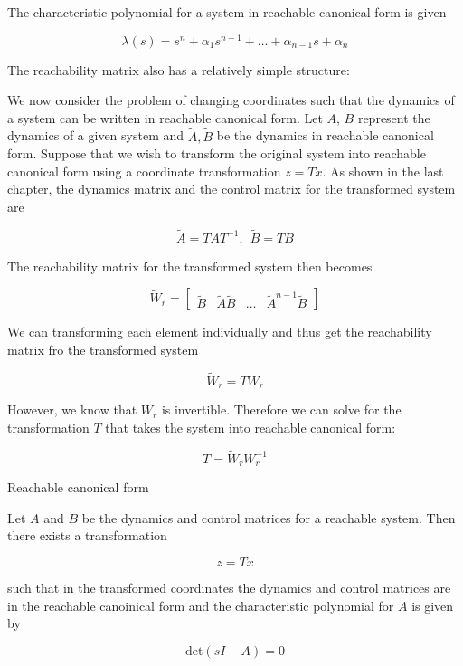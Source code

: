 The characteristic polynomial for a system in reachable canonical form is given

\begin{equation}
\lambda(s) = s^n +\alpha_1s^{n-1}+ \dots + \alpha_{n-1}s + \alpha_n
\end{equation}

The reachability matrix also has a relatively simple structure:

We now consider the problem of changing coordinates such that the dynamics
of a system can be written in reachable canonical form. Let $A$, $B$ represent the
dynamics of a given system and $\tilde{A}, \tilde{B}$ be the dynamics in reachable canonical form.
Suppose that we wish to transform the original system into reachable canonical
form using a coordinate transformation $z = Tx$. As shown in the last chapter, the
dynamics matrix and the control matrix for the transformed system are

\begin{equation}
\tilde{A} = TAT^{-1}, ~~ \tilde{B} = TB
\end{equation}

The reachability matrix for the transformed system then becomes

\begin{equation}
\tilde{W}_r = \begin{bmatrix}
 \tilde{B} & \tilde{A}\tilde{B} & \ldots & \tilde{A}^{n-1}\tilde{B} 
\end{bmatrix}
\end{equation}

We can transforming each element individually and thus get the reachability matrix fro the transformed system

\begin{equation}
\tilde{W}_r = TW_r
\end{equation}

However, we know that $W_r$ is invertible. Therefore we can solve for the transformation $T$ that takes the system into reachable canonical form:

\begin{equation}
T = \tilde{W}_r W_{r}^{-1}
\end{equation}


\begin{framed}
\theoremstyle{theorem}
\begin{theorem}{Reachable canonical form}

Let $A$ and $B$ be the dynamics and control matrices for a reachable system. Then there exists a transformation

\begin{equation}
z = Tx \nonumber
\end{equation}

such that in the transformed coordinates  the dynamics and control matrices are in the reachable 
canoinical form and the characteristic polynomial for $A$ is given by

\begin{equation}
\text{det}(sI-A) = 0 \nonumber
\end{equation}

\end{theorem}
\end{framed}

